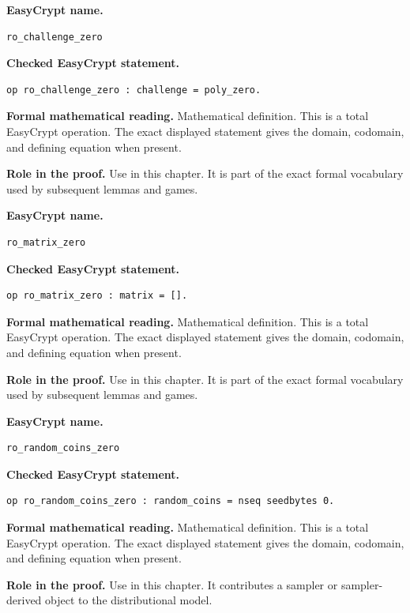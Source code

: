 \begin{formaldefinition}
\noindent\textbf{EasyCrypt name.}
\begin{lstlisting}[language=EasyCrypt,basicstyle=\ttfamily\scriptsize]
ro_challenge_zero
\end{lstlisting}
\noindent\textbf{Checked EasyCrypt statement.}
\begin{lstlisting}[language=EasyCrypt,basicstyle=\ttfamily\scriptsize]
op ro_challenge_zero : challenge = poly_zero.
\end{lstlisting}
\noindent\textbf{Formal mathematical reading.}
Mathematical definition. This is a total EasyCrypt operation.  The exact displayed statement gives the domain, codomain, and defining equation when present.

\noindent\textbf{Role in the proof.}
Use in this chapter. It is part of the exact formal vocabulary used by subsequent lemmas and games.

\end{formaldefinition}

\begin{formaldefinition}
\noindent\textbf{EasyCrypt name.}
\begin{lstlisting}[language=EasyCrypt,basicstyle=\ttfamily\scriptsize]
ro_matrix_zero
\end{lstlisting}
\noindent\textbf{Checked EasyCrypt statement.}
\begin{lstlisting}[language=EasyCrypt,basicstyle=\ttfamily\scriptsize]
op ro_matrix_zero : matrix = [].
\end{lstlisting}
\noindent\textbf{Formal mathematical reading.}
Mathematical definition. This is a total EasyCrypt operation.  The exact displayed statement gives the domain, codomain, and defining equation when present.

\noindent\textbf{Role in the proof.}
Use in this chapter. It is part of the exact formal vocabulary used by subsequent lemmas and games.

\end{formaldefinition}

\begin{formaldefinition}
\noindent\textbf{EasyCrypt name.}
\begin{lstlisting}[language=EasyCrypt,basicstyle=\ttfamily\scriptsize]
ro_random_coins_zero
\end{lstlisting}
\noindent\textbf{Checked EasyCrypt statement.}
\begin{lstlisting}[language=EasyCrypt,basicstyle=\ttfamily\scriptsize]
op ro_random_coins_zero : random_coins = nseq seedbytes 0.
\end{lstlisting}
\noindent\textbf{Formal mathematical reading.}
Mathematical definition. This is a total EasyCrypt operation.  The exact displayed statement gives the domain, codomain, and defining equation when present.

\noindent\textbf{Role in the proof.}
Use in this chapter. It contributes a sampler or sampler-derived object to the distributional model.

\end{formaldefinition}

